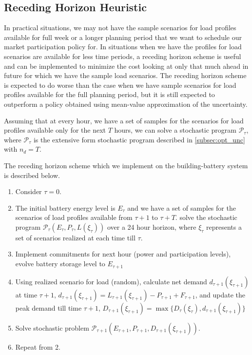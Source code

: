 \documentclass[11pt,twoside]{article}
\begin{document}
\subsection{Receding Horizon Heuristic}
In practical situations, we may not have the sample scenarios for load profiles available for full week or a longer planning period that we want to schedule our market participation policy for. In situations when we have the profiles for load scenarios are available for less time periods, a receding horizon scheme is useful and can be implemented to minimize the cost looking at only that much ahead in future for which we have the sample load scenarios. The receding horizon scheme is expected to do worse than the case when we have sample scenarios for load profiles available for the full planning period, but it is still expected to outperform a policy obtained using mean-value approximation of the uncertainty.

Assuming that at every hour, we have a set of samples for the scenarios for load profiles available only for the next $T$ hours, we can solve a stochastic program $\mathcal{P}_{\tau}$, where $\mathcal{P}_{\tau}$ is the extensive form stochastic program described in \ref{subsec:opt_unc} with $n_d = T$.

The receding horizon scheme which we implement on the building-battery system is described below.
\begin{enumerate}
\item Consider $\tau = 0$.
\item The initial battery energy level is $E_\tau$ and we have a set of samples for the scenarios of load profiles available from $\tau+1$ to $\tau+T$. solve the stochastic program $\mathcal{P}_{\tau}\left(E_{\tau},P_{\tau},L(\xi_{\tau})\right)$ over a 24 hour horizon, where $\xi_\tau$ represents a set of scenarios realized at each time till $\tau$. 
\item Implement commitments for next hour (power and participation levels), evolve battery storage level to $E_{\tau+1}$
\item Using realized scenario for load (random), calculate net demand $d_{\tau+1}(\xi_{\tau+1})$ at time $\tau+1$, $d_{\tau+1}(\xi_{\tau+1}) = L_{\tau+1}(\xi_{\tau+1}) - P_{\tau+1} + F_{\tau+1}$, and update the peak demand till time $\tau+1$, $D_{\tau+1}(\xi_{\tau+1}) = \max\{D_{\tau}(\xi_{\tau}),d_{\tau+1}(\xi_{\tau+1})\}$             
\item Solve stochastic problem $\mathcal{P}_{\tau+1}\left(E_{\tau+1},P_{\tau+1},D_{\tau+1}(\xi_{\tau+1})\right)$. \item Repeat from 2.
\end{enumerate}
\end{document}
